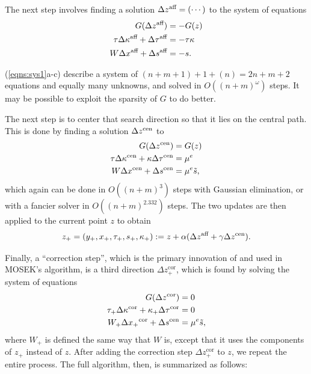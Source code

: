\begin{subappendices}
\begin{lproof}
    The next step involves finding a solution $\Delta {z}^{\text{aff}} = (\cdots)$
    to the system of equations
    \begin{subequations} \label{eqns:sys1}
    \begin{align}
        G(\Delta {z}^{\text{aff}}) &= -G(z) \\
        \tau \Delta {\kappa}^{\text{aff}} + \Delta {\tau}^{\text{aff}} &= - \tau \kappa \\
        W \Delta {x}^{\text{aff}} + \Delta {s}^{\text{aff}} &= -s.
    \end{align}
    \end{subequations}

    (\ref{eqns:sys1}a-c) describe a system of $(n + m + 1) + 1 + (n) = 2n + m + 2$ equations and equally many unknowns,
    and solved in $O((n+m)^\omega)$ steps.
    It may be possible to exploit the sparsity of $G$ to do better.

    The next step is to center that search direction so that it lies on the central path. This is done by finding a solution $\Delta {z}^{\text{cen}}$ to
    \begin{subequations}\label{eqns:sys2}
    \begin{align}
        G(\Delta {z}^{\text{cen}}) &= G(z) \\
        \tau \Delta {\kappa}^{\text{cen}} + \kappa \Delta {\tau}^{\text{cen}} &= \mu^e \\
        W \Delta {x}^{\text{cen}} + \Delta {s}^{\text{cen}} &= \mu^e \tilde s,
    \end{align}
    \end{subequations}
    which again can be done in $O((n+m)^3)$ steps with Gaussian elimination, or
    with a fancier solver in $O((n+m)^2.332)$ steps.
    The two updates are then applied to the current point $z$ to obtain
    \[
        z_+ = (y_+, x_+, \tau_+, s_+, \kappa_+) := z + \alpha (\Delta {z}^{\text{aff}} + \gamma \Delta {z}^{\text{cen}}).
    \]

    Finally, a ``correction step'', which is the primary innovation of \textcite{badenbroek2021algorithm} and used in MOSEK's algorithm,
    is a third direction $\Delta z_+^{\text{cor}}$, which is found by solving the system of equations
    \begin{subequations}\label{eqns:sys3}
    \begin{align}
        G(\Delta z^{\text{cor}}) &= 0 \\
        \tau_+ \Delta \kappa^{\text{cor}}  + \kappa_+ \Delta \tau^{\text{cor}} &= 0 \\
        W_+ \Delta {x_+}^{\text{cor}} + \Delta {s}^{\text{cen}} &= \mu^e \tilde s,
    \end{align}
    \end{subequations}
    where
    $W_+$ is defined the same way that $W$ is, except that it uses the components of $z_+$ instead of $z$.
    After adding the correction step $\Delta z_+^{\text{cor}}$ to $z$, we repeat the entire process. The full algorithm, then, is summarized as follows:


\end{lproof}
\end{subappendices}
